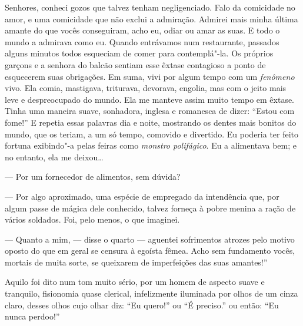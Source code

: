 Senhores, conheci gozos que talvez tenham negligenciado.
Falo da comicidade no amor, e uma comicidade que não exclui a
admiração. Admirei mais minha última amante do que vocês conseguiram,
acho eu, odiar ou amar as suas. E todo o mundo a admirava como
eu. Quando entrávamos num restaurante, passados alguns minutos todos
esqueciam de comer para contemplá"-la. Os próprios garçons e a senhora
do balcão sentiam esse êxtase contagioso a ponto de esquecerem suas
obrigações. Em suma, vivi por algum tempo com um \textit{fenômeno}
vivo. Ela comia, mastigava, triturava, devorava, engolia, mas com o
jeito mais leve e despreocupado do mundo. Ela me manteve assim 
muito tempo em êxtase. Tinha uma maneira suave, sonhadora, inglesa
e romanesca de dizer: “Estou com fome!'' E
repetia essas palavras dia e noite, mostrando os dentes mais bonitos do
mundo, que os teriam, a um só tempo, comovido e divertido. Eu
poderia ter feito fortuna exibindo"-a pelas feiras como \textit{monstro
polifágico}. Eu a alimentava bem; e no entanto, ela me deixou\ldots\ 

--- Por um fornecedor de alimentos, sem dúvida?

--- Por algo aproximado, uma espécie de empregado da intendência que,
por algum passe de mágica dele conhecido, talvez forneça à pobre
menina a ração de vários soldados. Foi, pelo menos, o que imaginei.

--- Quanto a mim, --- disse o quarto --- aguentei sofrimentos atrozes pelo motivo oposto do que em geral se censura à egoísta fêmea. Acho sem fundamento vocês, mortais de muita sorte, se queixarem de imperfeições das suas
amantes!”

Aquilo foi dito num tom muito sério, por um homem de aspecto suave e
tranquilo, fisionomia quase clerical, infelizmente iluminada por
olhos de um cinza claro, desses olhos cujo olhar diz: “Eu
quero!'' ou “É preciso.'' ou
então: “Eu nunca perdoo!''

